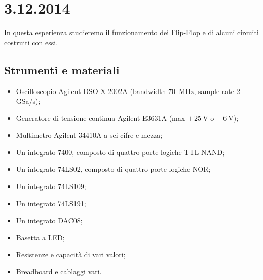 \section{3.12.2014 }

In questa esperienza studieremo il funzionamento dei Flip-Flop e di alcuni circuiti costruiti con essi.

\subsection*{Strumenti e materiali}

\begin{itemize} [noitemsep]
	\item Oscilloscopio Agilent DSO-X 2002A (bandwidth \SI{70}{\mega\hertz}, sample rate \num{2} GSa/s);
	\item Generatore di tensione continua Agilent E3631A (max $\pm \, \SI{25}{\volt}$ o $\pm \, \SI{6}{\volt}$);
	\item Multimetro Agilent 34410A a sei cifre e mezza;
	\item Un integrato 7400, composto di quattro porte logiche TTL NAND; %
	\item Un integrato 74LS02, composto di quattro porte logiche NOR;
	\item Un integrato 74LS109;
	\item Un integrato 74LS191;
	\item Un integrato DAC08;	
	\item Basetta a LED;		
	\item Resistenze e capacità di vari valori;
	\item Breadboard e cablaggi vari.
\end{itemize}
